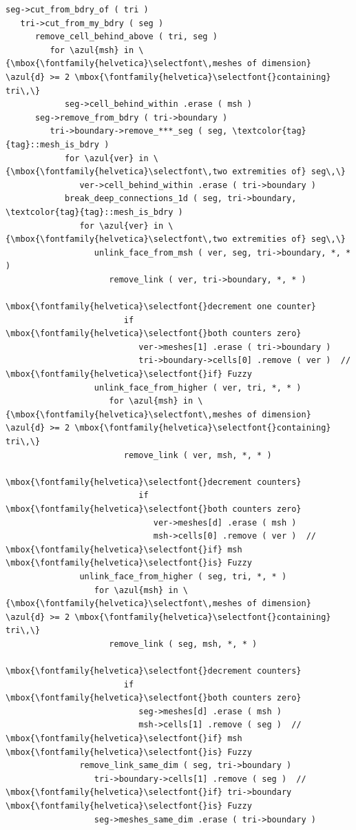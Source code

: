 \begin{Verbatim}[commandchars=\\\{\},formatcom=\small\tt,baselinestretch=0.94]
seg->cut_from_bdry_of ( tri )
   tri->cut_from_my_bdry ( seg )
      remove_cell_behind_above ( tri, seg )
         for \azul{msh} in \{\mbox{\fontfamily{helvetica}\selectfont\,meshes of dimension} \azul{d} >= 2 \mbox{\fontfamily{helvetica}\selectfont{}containing} tri\,\}
            seg->cell_behind_within .erase ( msh )
      seg->remove_from_bdry ( tri->boundary )
         tri->boundary->remove_***_seg ( seg, \textcolor{tag}{tag}::mesh_is_bdry )
            for \azul{ver} in \{\mbox{\fontfamily{helvetica}\selectfont\,two extremities of} seg\,\}
               ver->cell_behind_within .erase ( tri->boundary )
            break_deep_connections_1d ( seg, tri->boundary, \textcolor{tag}{tag}::mesh_is_bdry )
               for \azul{ver} in \{\mbox{\fontfamily{helvetica}\selectfont\,two extremities of} seg\,\}
                  unlink_face_from_msh ( ver, seg, tri->boundary, *, * )
                     remove_link ( ver, tri->boundary, *, * )
                        \mbox{\fontfamily{helvetica}\selectfont{}decrement one counter}
                        if \mbox{\fontfamily{helvetica}\selectfont{}both counters zero}
                           ver->meshes[1] .erase ( tri->boundary )
                           tri->boundary->cells[0] .remove ( ver )  // \mbox{\fontfamily{helvetica}\selectfont{}if} Fuzzy
                  unlink_face_from_higher ( ver, tri, *, * )
                     for \azul{msh} in \{\mbox{\fontfamily{helvetica}\selectfont\,meshes of dimension} \azul{d} >= 2 \mbox{\fontfamily{helvetica}\selectfont{}containing} tri\,\}
                        remove_link ( ver, msh, *, * )
                           \mbox{\fontfamily{helvetica}\selectfont{}decrement counters}
                           if \mbox{\fontfamily{helvetica}\selectfont{}both counters zero}
                              ver->meshes[d] .erase ( msh )
                              msh->cells[0] .remove ( ver )  // \mbox{\fontfamily{helvetica}\selectfont{}if} msh \mbox{\fontfamily{helvetica}\selectfont{}is} Fuzzy
               unlink_face_from_higher ( seg, tri, *, * )
                  for \azul{msh} in \{\mbox{\fontfamily{helvetica}\selectfont\,meshes of dimension} \azul{d} >= 2 \mbox{\fontfamily{helvetica}\selectfont{}containing} tri\,\}
                     remove_link ( seg, msh, *, * )
                        \mbox{\fontfamily{helvetica}\selectfont{}decrement counters}
                        if \mbox{\fontfamily{helvetica}\selectfont{}both counters zero}
                           seg->meshes[d] .erase ( msh )
                           msh->cells[1] .remove ( seg )  // \mbox{\fontfamily{helvetica}\selectfont{}if} msh \mbox{\fontfamily{helvetica}\selectfont{}is} Fuzzy
               remove_link_same_dim ( seg, tri->boundary )
                  tri->boundary->cells[1] .remove ( seg )  // \mbox{\fontfamily{helvetica}\selectfont{}if} tri->boundary \mbox{\fontfamily{helvetica}\selectfont{}is} Fuzzy
                  seg->meshes_same_dim .erase ( tri->boundary )
\end{Verbatim}


